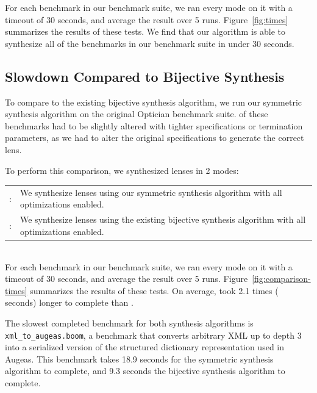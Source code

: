 \documentclass[acmsmall,screen,anonymous]{acmart}
\begin{document}
For each benchmark in our benchmark suite, we ran every mode on it with a
timeout of 30 seconds, and average the result over 5 runs.
Figure~\ref{fig:times} summarizes the results of these tests. We find that our
algorithm is able to synthesize all of the benchmarks in our benchmark suite in
under 30 seconds.

\subsection{Slowdown Compared to Bijective Synthesis}

To compare to the existing bijective synthesis algorithm, we run our symmetric
synthesis algorithm on the original Optician benchmark suite.  of these
benchmarks had to be slightly altered with tighter specifications or termination
parameters, as we had to alter the original specifications to generate the
correct lens.

To perform this comparison, we synthesized lenses in 2 modes:

\begin{tabulary}{\linewidth}{rL}
  \SSOpt{}: & We synthesize lenses using our symmetric synthesis algorithm with all optimizations enabled.\\
  \BSOpt{}: & We synthesize lenses using the existing bijective synthesis
              algorithm with all optimizations enabled.\\
\end{tabulary}\\

For each benchmark in our benchmark suite, we ran every mode on it with a
timeout of 30 seconds, and average the result over 5 runs.
Figure~\ref{fig:comparison-times} summarizes the results of these tests. On
average, \SSOpt{} took 2.1 times ( seconds) longer to complete than
\BSOpt{}.

The slowest completed benchmark for both synthesis algorithms is
\texttt{xml\_to\_augeas.boom}, a benchmark that converts arbitrary XML up to
depth 3 into a serialized version of the structured dictionary representation
used in Augeas. This benchmark takes 18.9 seconds for the symmetric synthesis
algorithm to complete, and 9.3 seconds the bijective synthesis algorithm to
complete. 
\end{document}
